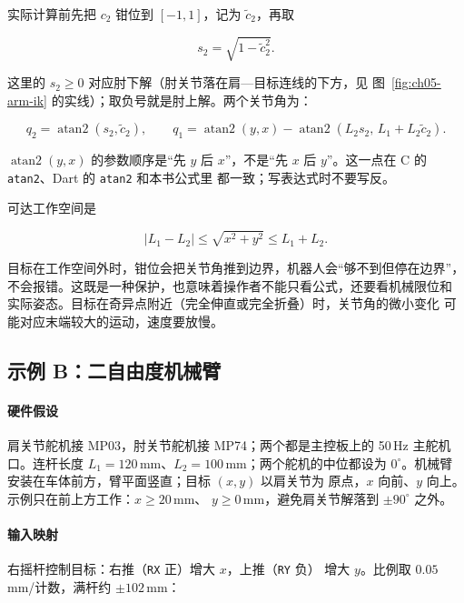 实际计算前先把 $c_2$ 钳位到 $[-1,1]$，记为 $\tilde c_2$，再取

\begin{equation}
s_2=\sqrt{1-\tilde c_2^2}.
\label{eq:ch05-ik-s2}
\end{equation}

这里的 $s_2\ge0$ 对应肘下解（肘关节落在肩—目标连线的下方，见
图~\ref{fig:ch05-arm-ik} 的实线）；取负号就是肘上解。两个关节角为：

\begin{equation}
q_2=\operatorname{atan2}(s_2,\tilde c_2),\qquad
q_1=\operatorname{atan2}(y,x)-\operatorname{atan2}(L_2s_2,\,L_1+L_2\tilde c_2).
\label{eq:ch05-ik-angles}
\end{equation}

$\operatorname{atan2}(y,x)$ 的参数顺序是“先 $y$ 后 $x$”，不是“先 $x$ 后
$y$”。这一点在 C 的 \texttt{atan2}、Dart 的 \texttt{atan2} 和本书公式里
都一致；写表达式时不要写反。

可达工作空间是

\begin{equation}
|L_1-L_2|\le\sqrt{x^2+y^2}\le L_1+L_2.
\label{eq:ch05-ik-workspace}
\end{equation}

目标在工作空间外时，钳位会把关节角推到边界，机器人会“够不到但停在边界”，
不会报错。这既是一种保护，也意味着操作者不能只看公式，还要看机械限位和
实际姿态。目标在奇异点附近（完全伸直或完全折叠）时，关节角的微小变化
可能对应末端较大的运动，速度要放慢。

\subsection{示例 B：二自由度机械臂}

\paragraph*{硬件假设}
肩关节舵机接 MP03，肘关节舵机接 MP74；两个都是主控板上的 50\,Hz 主舵机
口。连杆长度 $L_1=120$\,mm、$L_2=100$\,mm；两个舵机的中位都设为
$0^\circ$。机械臂安装在车体前方，臂平面竖直；目标 $(x,y)$ 以肩关节为
原点，$x$ 向前、$y$ 向上。示例只在前上方工作：$x\ge20$\,mm、
$y\ge0$\,mm，避免肩关节解落到 $\pm90^\circ$ 之外。

\paragraph*{输入映射}
右摇杆控制目标：右推（\texttt{RX} 正）增大 $x$，上推（\texttt{RY} 负）
增大 $y$。比例取 $0.05$\,mm/计数，满杆约 $\pm102$\,mm：

